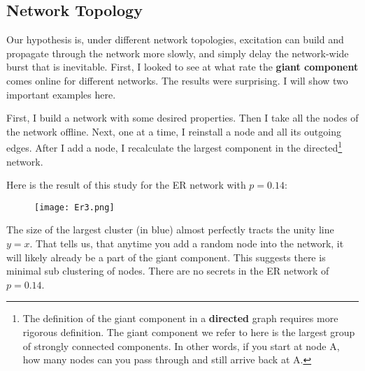 \documentclass{article}
\begin{document}

\subsection{Network Topology}
Our hypothesis is, under different network topologies, excitation can build and propagate through the network more slowly, and simply delay the network-wide burst that is inevitable. First, I looked to see at what rate the {\bf giant component }comes online for different networks. The results were surprising. I will show two important examples here.

First, I build a network with some desired properties. Then I take all the nodes of the network offline. Next, one at a time, I reinstall a node and all its outgoing edges. After I add a node, I recalculate the largest component in the directed\footnote{The definition of the giant component in a {\bf directed} graph requires more rigorous definition. The giant component we refer to here is the largest group of strongly connected components. In other words, if you start at node A, how many nodes can you pass through and still arrive back at A.}
network. 

Here is the result of this study for the ER network with $p=0.14$:

\begin{figure}[H]
\centering
\texttt{[image: Er3.png]}
\end{figure}

\dskip

The size of the largest cluster (in blue) almost perfectly tracts the unity line $y=x$. That tells us, that anytime you add a random node into the network, it will likely already be a part of the giant component. This suggests there is minimal sub clustering of nodes. There are no secrets in the ER network of $p=0.14$.
\end{document}
